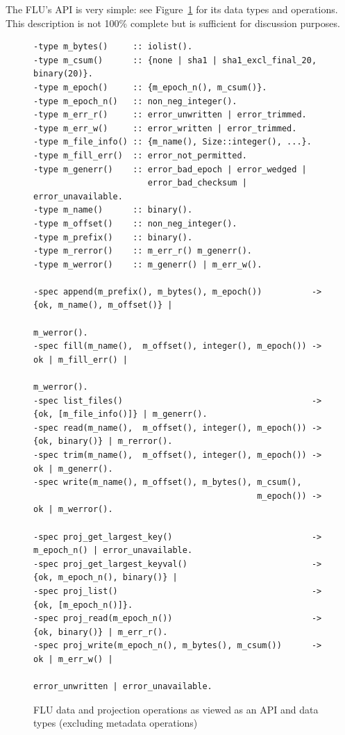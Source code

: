 \documentclass[preprint,10pt]{sigplanconf}
\begin{document}
The FLU's API is very simple: see Figure~\ref{fig:flu-api} for its
data types and operations.  This description is not 100\% complete but
is sufficient for discussion purposes.

\begin{figure}[]
\begin{verbatim}
-type m_bytes()     :: iolist().
-type m_csum()      :: {none | sha1 | sha1_excl_final_20, binary(20)}.
-type m_epoch()     :: {m_epoch_n(), m_csum()}.
-type m_epoch_n()   :: non_neg_integer().
-type m_err_r()     :: error_unwritten | error_trimmed.
-type m_err_w()     :: error_written | error_trimmed.
-type m_file_info() :: {m_name(), Size::integer(), ...}.
-type m_fill_err()  :: error_not_permitted.
-type m_generr()    :: error_bad_epoch | error_wedged |
                       error_bad_checksum | error_unavailable.
-type m_name()      :: binary().
-type m_offset()    :: non_neg_integer().
-type m_prefix()    :: binary().
-type m_rerror()    :: m_err_r() m_generr().
-type m_werror()    :: m_generr() | m_err_w().

-spec append(m_prefix(), m_bytes(), m_epoch())          -> {ok, m_name(), m_offset()} |
                                                           m_werror().
-spec fill(m_name(),  m_offset(), integer(), m_epoch()) -> ok | m_fill_err() |
                                                           m_werror().
-spec list_files()                                      -> {ok, [m_file_info()]} | m_generr().
-spec read(m_name(),  m_offset(), integer(), m_epoch()) -> {ok, binary()} | m_rerror().
-spec trim(m_name(),  m_offset(), integer(), m_epoch()) -> ok | m_generr().
-spec write(m_name(), m_offset(), m_bytes(), m_csum(),
                                             m_epoch()) -> ok | m_werror().

-spec proj_get_largest_key()                            -> m_epoch_n() | error_unavailable.
-spec proj_get_largest_keyval()                         -> {ok, m_epoch_n(), binary()} |
-spec proj_list()                                       -> {ok, [m_epoch_n()]}.
-spec proj_read(m_epoch_n())                            -> {ok, binary()} | m_err_r().
-spec proj_write(m_epoch_n(), m_bytes(), m_csum())      -> ok | m_err_w() |
                                                           error_unwritten | error_unavailable. 
\end{verbatim}
\caption{FLU data and projection operations as viewed as an API and data types (excluding metadata operations)}
\label{fig:flu-api}
\end{figure}
\end{document}
